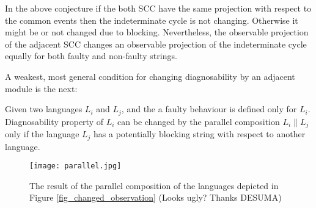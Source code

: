 \documentclass[a4paper,oneside]{article}
\begin{document}
In the above conjecture if the both SCC have the same projection with respect to
the common events then the indeterminate cycle is not changing. Otherwise it
might be or not changed due to blocking. Nevertheless, the observable
projection of the adjacent SCC changes an observable projection of
the indeterminate cycle equally for both faulty and non-faulty strings.

A weakest, most general condition for changing diagnosability by an
adjacent module is the next:

\begin{conjecture} Given two
languages $L_i$ and $L_j$, and the a faulty behaviour is defined only for $L_i$.
Diagnosability property of $L_i$ can be changed by the parallel composition $L_i
\parallel L_j$ only if the language $L_j$ has a potentially blocking string with
respect to another language.
\end{conjecture}






\begin{figure}[ht]
\centering
	\texttt{[image: parallel.jpg]}
	\caption{The result of the parallel composition of the languages depicted in
	Figure \ref{fig_changed_observation} (Looks ugly? Thanks DESUMA)}
	\label{fig_example_parallel}
\end{figure}
\end{document}
